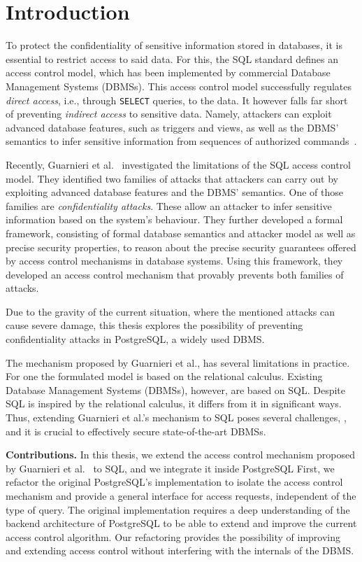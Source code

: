 \section{Introduction}
To protect the confidentiality of sensitive information stored in databases, it is essential to restrict access to said data.
%
For this, the SQL standard defines an access control model, which has been implemented by commercial Database Management Systems (DBMSs). 
%
This access control model successfully regulates \emph{direct access}, i.e., through \texttt{SELECT} queries, to the data. It however falls far short of preventing \emph{indirect access} to sensitive data.
%
Namely, attackers can exploit advanced database features, such as triggers and views, as well as the DBMS' semantics to infer sensitive information from sequences of authorized commands~\cite{guarnieri2016strong, ..., ..., ...}.
%

Recently, Guarnieri et al.~\cite{guarnieri2016strong} investigated the limitations of the SQL access control model. 
%
They identified two families of attacks that attackers can carry out by exploiting advanced database features and the DBMS' semantics.
%
One of those families are \emph{confidentiality attacks}. These allow an attacker to infer sensitive information based on the system's behaviour.
%
They further developed a formal framework, consisting of formal database semantics and attacker model as well as precise security properties, to reason about the precise security guarantees offered by access control mechanisms in database systems.
%
Using this framework, they developed an access control mechanism that provably prevents both families of attacks.

Due to the gravity of the current situation, where the mentioned attacks can cause severe damage, this thesis explores the possibility of preventing confidentiality attacks in PostgreSQL, a widely used DBMS.

The mechanism proposed by Guarnieri et al., has several limitations in practice.
%
For one the formulated model is based on the relational calculus. 
%
Existing Database Management Systems (DBMSs), however, are based on SQL.
%
Despite SQL is inspired by the relational calculus, it differs from it in significant ways.
%
Thus, extending Guarnieri et al.'s mechanism to SQL poses several challenges, , and it is crucial to effectively secure state-of-the-art DBMSs.

\smallskip
\noindent
{\bf Contributions.}
%
In this thesis, we extend  the access control mechanism proposed by Guarnieri et al.~\cite{guarnieri2016strong} to SQL, and we integrate it inside PostgreSQL
%
First, we refactor the original PostgreSQL's implementation to isolate the access control mechanism and provide a general interface for access requests, independent of the type of query.
%
The original implementation requires a deep understanding of the backend architecture of PostgreSQL to be able to extend and improve the current access control algorithm.
%
Our refactoring provides the possibility of improving and extending access control without interfering with the internals of the DBMS.

